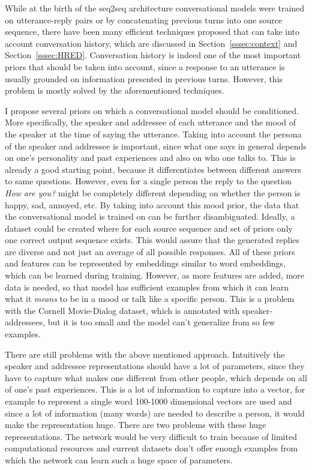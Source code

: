 \documentclass[12pt]{article}
\begin{document}
While at the birth of the seq2seq architecture conversational models were trained on utterance-reply pairs or by concatenating previous turns into one source sequence, there have been many efficient techniques proposed that can take into account conversation history, which are discussed in Section~\ref{sssec:context} and Section~\ref{sssec:HRED}. Conversation history is indeed one of the most important priors that should be taken into account, since a response to an utterance is usually grounded on information presented in previous turns. However, this problem is mostly solved by the aforementioned techniques.

I propose several priors on which a conversational model should be conditioned. More specifically, the speaker and addressee of each utterance and the mood of the speaker at the time of saying the utterance. Taking into account the persona of the speaker and addressee is important, since what one says in general depends on one's personality and past experiences and also on who one talks to. This is already a good starting point, because it differentiates between different answers to same questions. However, even for a single person the reply to the question \textit{How are you?} might be completely different depending on whether the person is happy, sad, annoyed, etc. By taking into account this mood prior, the data that the conversational model is trained on can be further disambiguated. Ideally, a dataset could be created where for each source sequence and set of priors only one correct output sequence exists. This would assure that the generated replies are diverse and not just an average of all possible responses. All of these priors and features can be represented by embeddings similar to word embeddings, which can be learned during training. However, as more features are added, more data is needed, so that model has sufficient examples from which it can learn what it \textit{means} to be in a mood or talk like a specific person. This is a problem with the Cornell Movie-Dialog dataset, which is annotated with speaker-addressees, but it is too small and the model can't generalize from so few examples. 

There are still problems with the above mentioned approach. Intuitively the speaker and addressee representations should have a lot of parameters, since they have to capture what makes one different from other people, which depends on all of one's past experiences. This is a lot of information to capture into a vector, for example to represent a single word 100-1000 dimensional vectors are used and since a lot of information (many words) are needed to describe a person, it would make the representation huge. There are two problems with these huge representations. The network would be very difficult to train because of limited computational resources and current datasets don't offer enough examples from which the network can learn such a huge space of parameters.
\end{document}
